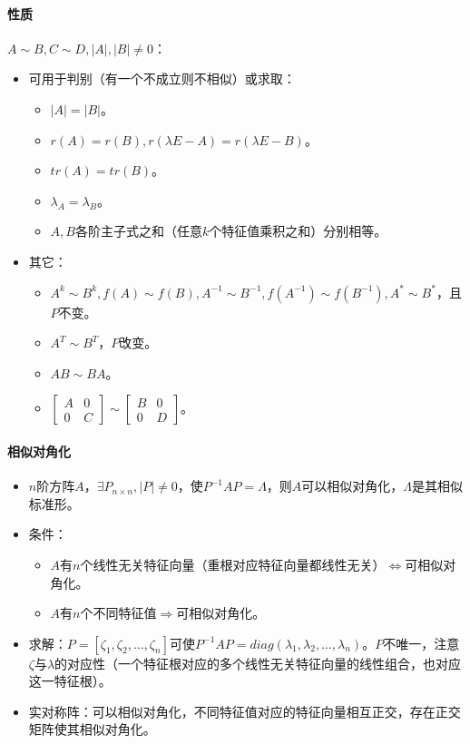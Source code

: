 \documentclass[
12pt, %
a4paper, 
oneside, %
headinclude,footinclude, %
]{scrartcl}
\begin{document}
\paragraph{性质}
$ A \sim B, C \sim D, |A|,|B| \neq 0 $：
\begin{itemize}
\item 可用于判别（有一个不成立则不相似）或求取：
\begin{itemize}
\item $ |A| = |B| $。
\item $ r(A) = r(B), r(\lambda E - A) = r(\lambda E - B) $。
\item $ tr(A) = tr(B) $。
\item $ \lambda_A = \lambda_B $。
\item $ A,B $各阶主子式之和（任意$ k $个特征值乘积之和）分别相等。
\end{itemize}
\item 其它：
\begin{itemize}
\item $ A^k \sim B^k, f(A) \sim f(B), A^{-1} \sim B^{-1}, f(A^{-1}) \sim f(B^{-1}), A^* \sim B^* $，且$ P $不变。
\item $ A^T \sim B^T $，$ P $改变。
\item $ AB \sim BA $。
\item $ \begin{bmatrix} A & 0 \\ 0 & C \end{bmatrix} \sim \begin{bmatrix} B & 0 \\ 0 & D \end{bmatrix} $。
\end{itemize} 
\end{itemize}
\paragraph{相似对角化}
\begin{itemize}
\item $ n $阶方阵$ A $，$ \exists P_{n \times n}, |P| \neq 0 $，使$ P^{-1}AP = \varLambda $，则$ A $可以相似对角化，$ \varLambda $是其相似标准形。
\item 条件：
\begin{itemize}
\item $ A $有$ n $个线性无关特征向量（重根对应特征向量都线性无关）$ \Leftrightarrow $可相似对角化。
\item $ A $有$ n $个不同特征值$ \Rightarrow $可相似对角化。
\end{itemize} 
\item 求解：$ P = [\zeta_1, \zeta_2, \dots, \zeta_n] $可使$ P^{-1}AP = diag(\lambda_1, \lambda_2, \dots ,\lambda_n) $。$ P $不唯一，注意$ \zeta $与$ \lambda $的对应性（一个特征根对应的多个线性无关特征向量的线性组合，也对应这一特征根）。
\item 实对称阵：可以相似对角化，不同特征值对应的特征向量相互正交，存在正交矩阵使其相似对角化。
\end{itemize} 
\end{document}
